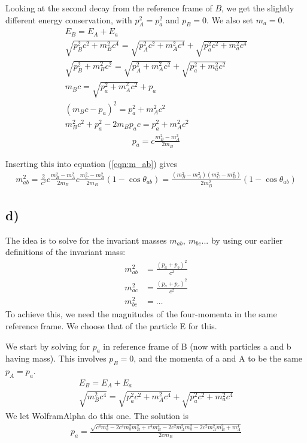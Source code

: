 \documentclass[12p,a4paper]{article}
\begin{document}
Looking at the second decay from the reference frame of $B$, we get the slightly different energy conservation, with $p_A^2 = p_a^2$ and $p_B = 0$. We also set $m_a = 0$.
\begin{gather*}
    E_B = E_A + E_a \\
    \sqrt{p_B^2c^2 + m_B^2c^4} = \sqrt{p_A^2c^2 + m_A^2c^4} + \sqrt{p_a^2c^2 + m_a^2c^4} \\
    \sqrt{p_B^2 + m_B^2c^2} = \sqrt{p_A^2 + m_A^2c^2} + \sqrt{p_a^2 + m_a^2c^2} \\
    m_Bc = \sqrt{p_a^2 + m_A^2c^2} + p_a \\
    (m_Bc - p_a)^2 = p_a^2 + m_A^2c^2 \\
    m_B^2c^2+ p_a^2 - 2m_Bp_ac = p_a^2 + m_A^2c^2
\end{gather*}
\begin{gather}
    p_a = c\frac{m_B^2 - m_A^2}{2m_B}
\end{gather}

Inserting this into equation (\ref{eqn:m_ab}) gives
\begin{align*}
    m_{ab}^2 = \frac{2}{c^2}c\frac{m_B^2 - m_A^2}{2m_B}c\frac{m_C^2 - m_B^2}{2m_B}(1-\cos{\theta_{ab}}) = \frac{(m_B^2 - m_A^2)(m_C^2 - m_B^2)}{2m_B^2}(1-\cos{\theta_{ab}})
\end{align*}



\subsection*{d)}
The idea is to solve for the invariant masses $m_{ab},\ m_{bc}...$ by using our earlier definitions of the invariant mass:
\begin{align*}
    m_{ab}^2 &= \frac{(p_a + p_b)^2}{c^2}\\
    m_{ac}^2 &= \frac{(p_a + p_c)^2}{c^2}\\
    m_{bc}^2 &= \dots
\end{align*}
To achieve this, we need the magnitudes of the four-momenta in the same reference frame. We choose that of the particle E for this.

We start by solving for $p_a$ in reference frame of B (now with particles a and b having mass). This involves $p_B = 0$, and the momenta of a and A to be the same $p_A = p_a$.
\begin{gather*}
    E_B = E_A + E_a \\
    \sqrt{m_B^2c^4} = \sqrt{p_a^2c^2 + m_A^2c^4} + \sqrt{p_a^2c^2 + m_a^2c^4}
\end{gather*}
We let WolframAlpha do this one. The solution is
\begin{align}
    p_a = \frac{\sqrt{ c^4m_a^4 - 2c^4m_a^2m_B^2 + c^4m_B^4 - 2c^2m_A^2m_a^2 - 2c^2m_A^2 m_B^2 + m_A^4 }}{ 2cm_B }
\end{align}
\end{document}
